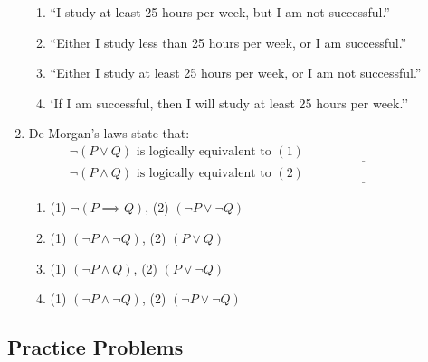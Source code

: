 \begin{enumerate}
  \begin{enumerate}
      \item ``I study at least 25 hours per week, but I am not successful.''
      \item ``Either I study less than 25 hours per week, or I am successful.''
      \item ``Either I study at least 25 hours per week, or I am not successful.''
      \item `If I am successful, then I will study at least 25 hours per week.''
  \end{enumerate}
  \item De Morgan's laws state that:
  \begin{gather*}
    \neg(P\vee Q) \text{ is logically equivalent to } (1) \underline{\phantom{(\neg P)\wedge (\neg Q)}\qquad}\\
    \neg(P\wedge Q) \text{ is logically equivalent to } (2) \underline{\phantom{(\neg P)\vee (\neg Q)\qquad}}
  \end{gather*}
  \begin{enumerate}
      \item (1) $\neg (P \implies Q)$, \quad (2) $(\neg P \lor \neg Q)$
      \item (1) $(\neg P \land \neg Q)$, \quad (2) $(P \lor Q)$
      \item (1) $(\neg P \land Q)$, \quad (2) $(P \lor \neg Q)$
      \item (1) $(\neg P \land \neg Q)$, \quad (2) $(\neg P \lor \neg Q)$
  \end{enumerate}
\end{enumerate}

\subsection*{Practice Problems}

